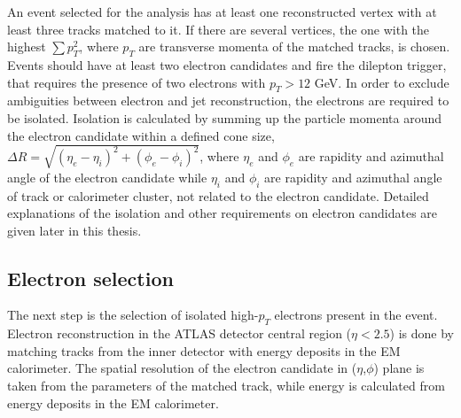 An event selected for the analysis has at least one reconstructed vertex with at least three tracks matched to it. 
If there are several vertices, the one with the highest
$\sum p^2_T$, where $p_T$ are transverse momenta of the matched tracks, is chosen.
Events should have at least two electron candidates and fire the dilepton trigger, that requires the presence of two electrons with $p_T > 12$ GeV.
In order to exclude ambiguities between electron and jet reconstruction, the electrons are required to
be isolated. Isolation is calculated by summing up the particle momenta around the electron candidate within a defined cone size, 
$\Delta R = \sqrt{ (\eta_e-\eta_i)^2 + (\phi_e-\phi_i)^2 }$,
where $\eta_e$ and $\phi_e$ are rapidity and azimuthal angle of the electron candidate while $\eta_i$ and $\phi_i$ are rapidity and azimuthal angle of track or calorimeter cluster, not related to the electron candidate. Detailed explanations of the isolation and other requirements on electron candidates are given later in this thesis.

\subsection{Electron selection}
\label{subsec:electron_selection}
The next step is the selection of isolated high-$p_T$ electrons present in the event.
Electron reconstruction in the ATLAS detector central region ($\eta<2.5$) is done by matching tracks from the inner detector with energy deposits in the EM calorimeter.
The spatial resolution of the electron candidate in ($\eta$,$\phi$) plane is taken from the parameters of the matched track,
while energy is calculated from energy deposits in the EM calorimeter.



